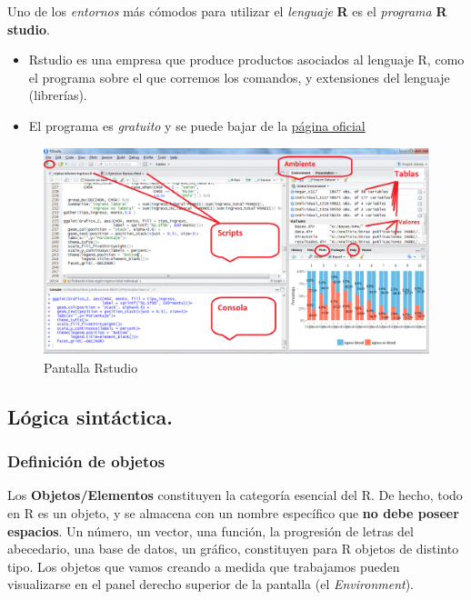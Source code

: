 \documentclass[]{book}
\begin{document}
Uno de los \emph{entornos} más cómodos para utilizar el \emph{lenguaje} \textbf{R} es el \emph{programa} \textbf{R studio}.

\begin{itemize}
\item
  Rstudio es una empresa que produce productos asociados al lenguaje R, como el programa sobre el que corremos los comandos, y extensiones del lenguaje (librerías).
\item
  El programa es \emph{gratuito} y se puede bajar de la
  \href{https://www.rstudio.com/}{página oficial}
\end{itemize}

\begin{figure}
\centering
\includegraphics[width=10.41667in,height=\textheight]{img/Pantalla Rstudio.png}
\caption{Pantalla Rstudio}
\end{figure}

\hypertarget{logica-sintactica.}{%
\subsection{Lógica sintáctica.}\label{logica-sintactica.}}

\hypertarget{definicion-de-objetos}{%
\subsubsection{Definición de objetos}\label{definicion-de-objetos}}

Los \textbf{Objetos/Elementos} constituyen la categoría esencial del R. De hecho, todo en R es un objeto, y se almacena con un nombre específico que \textbf{no debe poseer espacios}. Un número, un vector, una función, la progresión de letras del abecedario, una base de datos, un gráfico, constituyen para R objetos de distinto tipo. Los objetos que vamos creando a medida que trabajamos pueden visualizarse en el panel derecho superior de la pantalla (el \emph{Environment}).
\end{document}
